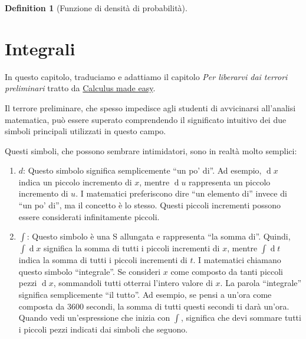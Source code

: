 \documentclass[
  letterpaper,
  DIV=11,
  numbers=noendperiod,
  oneside]{scrreprt}
\theoremstyle{definition}
\theoremstyle{plain}
\theoremstyle{definition}
\newtheorem{definition}{Definition}[chapter]
\theoremstyle{remark}
\begin{document}
\begin{definition}[Funzione di densità di
probabilità]
\section{Integrali}\label{integrali}

In questo capitolo, traduciamo e adattiamo il capitolo \emph{Per
liberarvi dai terrori preliminari} tratto da
\href{https://calculusmadeeasy.org/1.html}{Calculus made easy}.

\begin{tcolorbox}[enhanced jigsaw, arc=.35mm, breakable, colbacktitle=quarto-callout-important-color!10!white, opacityback=0, toprule=.15mm, rightrule=.15mm, colback=white, opacitybacktitle=0.6, leftrule=.75mm, coltitle=black, bottomtitle=1mm, left=2mm, toptitle=1mm, title=\textcolor{quarto-callout-important-color}{\faExclamation}\hspace{0.5em}{Important}, titlerule=0mm, bottomrule=.15mm, colframe=quarto-callout-important-color-frame]

Il terrore preliminare, che spesso impedisce agli studenti di
avvicinarsi all'analisi matematica, può essere superato comprendendo il
significato intuitivo dei due simboli principali utilizzati in questo
campo.

Questi simboli, che possono sembrare intimidatori, sono in realtà molto
semplici:

\begin{enumerate}
\def\labelenumi{\arabic{enumi}.}
\item
  \textbf{\(d\)}: Questo simbolo significa semplicemente ``un po' di''.
  Ad esempio, \(\operatorname{d}\!x\) indica un piccolo incremento di
  \(x\), mentre \(\operatorname{d}\!u\) rappresenta un piccolo
  incremento di \(u\). I matematici preferiscono dire ``un elemento di''
  invece di ``un po' di'', ma il concetto è lo stesso. Questi piccoli
  incrementi possono essere considerati infinitamente piccoli.
\item
  \textbf{\(\int\)}: Questo simbolo è una S allungata e rappresenta ``la
  somma di''. Quindi, \(\int \operatorname{d}\!x\) significa la somma di
  tutti i piccoli incrementi di \(x\), mentre
  \(\int \operatorname{d}\!t\) indica la somma di tutti i piccoli
  incrementi di \(t\). I matematici chiamano questo simbolo
  ``integrale''. Se consideri \(x\) come composto da tanti piccoli pezzi
  \(\operatorname{d}\!x\), sommandoli tutti otterrai l'intero valore di
  \(x\). La parola ``integrale'' significa semplicemente ``il tutto''.
  Ad esempio, se pensi a un'ora come composta da 3600 secondi, la somma
  di tutti questi secondi ti darà un'ora. Quando vedi un'espressione che
  inizia con \(\int\), significa che devi sommare tutti i piccoli pezzi
  indicati dai simboli che seguono.
\end{enumerate}


\end{tcolorbox}
\end{definition}
\end{document}
